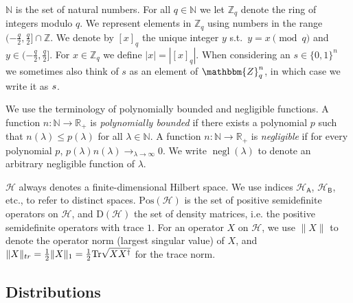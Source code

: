 \documentclass[11pt]{article}
\theoremstyle{remark}
\theoremstyle{definition}
\newcommand{\Tr}{\mbox{\rm Tr}}
\newcommand{\reg}[1]{{\textsf{#1}}}
\newcommand{\N}{\ensuremath{\mathbb{N}}}
\newcommand{\bbN}{\ensuremath{\mathbb{N}}}
\newcommand{\R}{\ensuremath{\mathbb{R}}}
\newcommand{\mH}{\mathcal{H}}
\newcommand{\setft}[1]{\mathrm{#1}}
\newcommand{\Density}{\setft{D}}
\newcommand{\Pos}{\setft{Pos}}
\DeclareMathOperator{\negl}{negl}
\newcommand{\mZ}{\mathbbm{Z}}
\newcommand{\trnq}[1]{\left[ {#1} \right]_q}
\newcommand{\bbZ}{\mathbb{Z}}
\newcommand{\abs}[1]{\left\vert {#1} \right\vert}
\begin{document}
$\N$ is the set of natural numbers. 
For all $q \in \bbN$ we let $\bbZ_q$ denote the ring of integers modulo $q$. We represent elements in $\bbZ_q$ using numbers in the range $(-\tfrac{q}{2}, \tfrac{q}{2}] \cap \bbZ$. We denote by $\trnq{x}$ the unique integer $y$ s.t.\ $y = x \pmod{q}$ and $y \in (-\frac{q}{2}, \frac{q}{2}]$. For $x\in\bbZ_q$ we define $\abs{x}=|{\trnq{x}}|$.
When considering an $s\in \{0,1\}^n$ we sometimes also think of $s$ as an element of $\mZ_q^n$, in which case we write it as $\*s$. 

We use the terminology of polynomially bounded and negligible functions. A function $n: \N \to \R_+$ is \emph{polynomially bounded} if there exists a polynomial $p$ such that $n(\lambda)\leq p(\lambda)$ for all $\lambda \in \N$. A function $n: \N \to \R_+$ is \emph{negligible} if for every polynomial $p$, $p(\lambda) n(\lambda)\to_{\lambda\to\infty} 0$. We write $\negl(\lambda)$ to denote an arbitrary negligible function of $\lambda$. 

 $\mH$ always denotes a finite-dimensional Hilbert space. We use indices $\mH_\reg{A}$, $\mH_\reg{B}$, etc., to refer to distinct spaces. $\Pos(\mH)$ is the set of positive semidefinite operators on $\mH$, and $\Density(\mH)$ the set of density matrices, i.e. the positive semidefinite operators with trace $1$. For an operator $X$ on $\mH$, we use $\|X\|$ to denote the operator norm (largest singular value) of $X$, and $\|X\|_{tr} = \frac{1}{2}\|X\|_1 = \frac{1}{2}\Tr\sqrt{XX^\dagger}$ for the trace norm. 

\subsection{Distributions}
\end{document}
